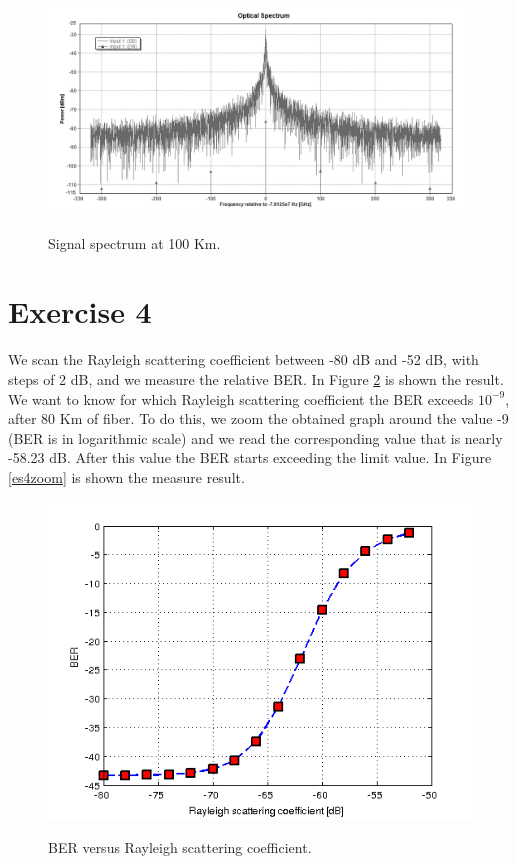 \documentclass[a4paper,10pt]{report}
\begin{document}
\begin{figure}[!ht]
  \centering
  \includegraphics[width=11cm]{es3_100km.png}\\
  \caption{Signal spectrum at 100 Km.}
  \label{es3_2}
\end{figure}


\section*{Exercise 4}
We scan the Rayleigh scattering coefficient between -80 dB and -52 dB, with steps of 2 dB, and we measure the relative BER.
In Figure \ref{es4} is shown the result.
We want to know for which Rayleigh scattering coefficient the BER exceeds $10^{-9}$, after 80 Km of fiber.
To do this, we zoom the obtained graph around the value -9 (BER is in logarithmic scale) and we read the corresponding value that is nearly -58.23 dB.
After this value the BER starts exceeding the limit value.
In Figure \ref{es4zoom} is shown the measure result.

\begin{figure}[!h]
  \centering
  \includegraphics[width=12cm]{es4.png}\\
  \caption{BER versus Rayleigh scattering coefficient.}
  \label{es4}
\end{figure}
\end{document}
